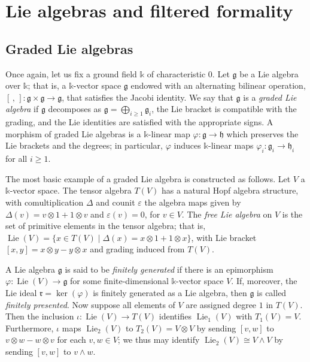 \documentclass{article}
\numberwithin{equation}{section}
\theoremstyle{definition}
\renewcommand{\k}{\mathbb{k}}
\newcommand{\g}{{\mathfrak{g}}}
\newcommand{\h}{{\mathfrak{h}}}
\DeclareMathOperator{\Lie}{Lie}
\begin{document}
\section{Lie algebras and filtered formality}
\label{sect:Lie-algebras}
 
\subsection{Graded Lie algebras}
\label{subsec:grlie}
Once again, let us fix a ground field $\k$ of characteristic $0$.  Let $\g$ be 
a Lie algebra over $\k$; that is, a $\k$-vector space $\g$ endowed with an  
alternating bilinear operation, $[\,,\,]\colon \g\times \g\to \g$, that satisfies 
the Jacobi identity.  We say that $\g$ is a {\em graded Lie algebra}\/ if $\g$ 
decomposes as $\g=\bigoplus_{i\ge 1} \g_i$, the Lie bracket is compatible 
with the grading, and the Lie identities are satisfied with the appropriate signs.  
A morphism of graded Lie algebras is a 
$\k$-linear map $\varphi\colon \g\to \h$ which preserves the Lie brackets 
and the degrees; in particular, $\varphi$ induces $\k$-linear maps 
$\varphi_i\colon \g_i\to \h_i$ for all $i\ge 1$.

The most basic example of a graded Lie algebra is constructed as follows.  
Let $V$ a $\k$-vector space. The tensor algebra $T(V)$ has a natural 
Hopf algebra structure, with comultiplication $\Delta$ and counit $\varepsilon$ 
the algebra maps given by $\Delta(v)= v\otimes 1+1\otimes v$ and $\varepsilon(v)= 0$, 
for $v\in V$. The {\em free Lie algebra}\/ on $V$ is the set  of primitive 
elements in the tensor algebra; that is, 
$\Lie(V)=\{x \in T(V) \mid \Delta(x)=x \otimes 1+
1\otimes x\}$, with Lie bracket $[x,y]=x\otimes y-y\otimes x$ 
and grading induced from $T(V)$. 

A Lie algebra $\g$ is said to be \textit{finitely generated}\/ if there 
is an epimorphism $\varphi\colon \Lie(V)\to \g$ for some finite-dimensional 
$\k$-vector space $V$. 
If, moreover, the Lie ideal $\mathfrak{r}=\ker (\varphi)$ is finitely 
generated as a Lie algebra, then $\g$ is called \textit{finitely presented}. 
Now suppose all elements of $V$ are assigned degree $1$ in $T(V)$.  Then 
the inclusion $\iota\colon \Lie(V)\to T(V)$ identifies $\Lie_1(V)$ with $T_1(V)=V$.  
Furthermore, $\iota$ maps $\Lie_2(V)$ to $T_2(V)=V\otimes V$ 
by sending $[v,w]$ to $v\otimes w-w\otimes v$ for each $v,w\in V$;   
we thus may identify $\Lie_2(V)\cong V\wedge V$ by sending 
$[v,w]$ to $v\wedge w$.   
\end{document}
